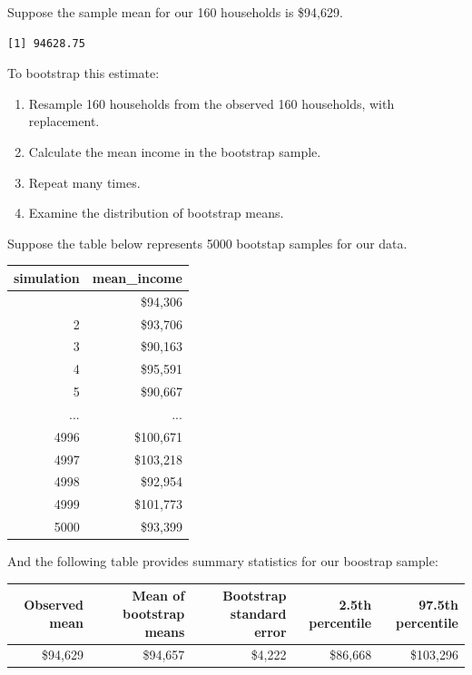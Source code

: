 \documentclass[
  letterpaper,
  DIV=11,
  numbers=noendperiod]{scrreprt}
\providecommand{\tightlist}{%
  \setlength{\itemsep}{0pt}\setlength{\parskip}{0pt}}
\begin{document}
Suppose the sample mean for our 160 households is \$94,629.

\begin{verbatim}
[1] 94628.75
\end{verbatim}

To bootstrap this estimate:

\begin{enumerate}
\def\labelenumi{\arabic{enumi}.}
\tightlist
\item
  Resample 160 households from the observed 160 households, with
  replacement.
\item
  Calculate the mean income in the bootstrap sample.
\item
  Repeat many times.
\item
  Examine the distribution of bootstrap means.
\end{enumerate}

Suppose the table below represents 5000 bootstap samples for our data.

\begin{table}
\fontsize{12.0pt}{14.0pt}\selectfont
\begin{tabular*}{\linewidth}{@{\extracolsep{\fill}}rr}
\toprule
simulation & mean\_income \\ 
\midrule\addlinespace[2.5pt]
1 & \$94,306 \\ 
2 & \$93,706 \\ 
3 & \$90,163 \\ 
4 & \$95,591 \\ 
5 & \$90,667 \\ 
... & ... \\ 
4996 & \$100,671 \\ 
4997 & \$103,218 \\ 
4998 & \$92,954 \\ 
4999 & \$101,773 \\ 
5000 & \$93,399 \\ 
\bottomrule
\end{tabular*}
\end{table}

And the following table provides summary statistics for our boostrap
sample:

\begin{table}
\fontsize{12.0pt}{14.0pt}\selectfont
\begin{tabular*}{\linewidth}{@{\extracolsep{\fill}}rrrrr}
\toprule
Observed mean & Mean of bootstrap means & Bootstrap standard error & 2.5th percentile & 97.5th percentile \\ 
\midrule\addlinespace[2.5pt]
\$94,629 & \$94,657 & \$4,222 & \$86,668 & \$103,296 \\ 
\bottomrule
\end{tabular*}
\end{table}
\end{document}
